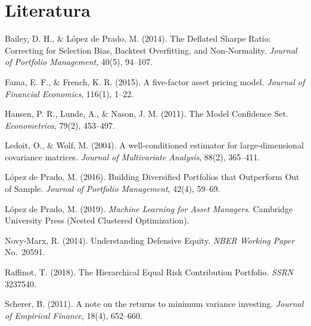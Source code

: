 \documentclass[11pt]{article}
\begin{document}
\section{Literatura}

\begin{enumerate}[label={[\arabic*]}]
  \item Bailey, D. H., \& López de Prado, M. (2014). The Deflated Sharpe Ratio:
        Correcting for Selection Bias, Backtest Overfitting, and Non-Normality.
        \textit{Journal of Portfolio Management}, 40(5), 94--107.
  \item Fama, E. F., \& French, K. R. (2015). A five-factor asset pricing model.
        \textit{Journal of Financial Economics}, 116(1), 1--22.
  \item Hansen, P. R., Lunde, A., \& Nason, J. M. (2011). The Model Confidence
        Set. \textit{Econometrica}, 79(2), 453--497.
  \item Ledoit, O., \& Wolf, M. (2004). A well-conditioned estimator for
        large-dimensional covariance matrices. \textit{Journal of Multivariate
        Analysis}, 88(2), 365--411.
  \item López de Prado, M. (2016). Building Diversified Portfolios that Outperform
        Out of Sample. \textit{Journal of Portfolio Management}, 42(4), 59--69.
  \item López de Prado, M. (2019). \textit{Machine Learning for Asset Managers}.
        Cambridge University Press (Nested Clustered Optimization).
  \item Novy-Marx, R. (2014). Understanding Defensive Equity.
        \textit{NBER Working Paper} No.\ 20591.
  \item Raffinot, T. (2018). The Hierarchical Equal Risk Contribution Portfolio.
        \textit{SSRN} 3237540.
  \item Scherer, B. (2011). A note on the returns to minimum variance investing.
        \textit{Journal of Empirical Finance}, 18(4), 652--660.
\end{enumerate}
\end{document}

